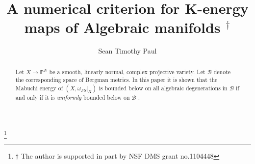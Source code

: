\documentclass[12pt]{amsart}
\numberwithin{equation}{section}
\numberwithin{remark}{section}
\numberwithin{theorem}{section}
\numberwithin{proposition}{section}
\numberwithin{definition}{section}
\numberwithin{lemma}{section}
\numberwithin{claim}{section}
\numberwithin{corollary}{section}
\numberwithin{conjecture}{section}
\begin{document}

\title[numerical criterion ]{A numerical criterion for K-energy maps of Algebraic manifolds $^\dagger$ }
\author{Sean Timothy Paul}   
\thanks{$\dagger$ The author is supported in part by NSF DMS grant no.1104448}
\address{l'Institut Henri Poincar\'e, 11 Rue Pierre et Marie Curie, 75005 Paris, France}
\address{and the Mathematics Dept. Univ. of Wisconsin, Madison}
 
 \vspace{-5mm}
\begin{abstract} {Let $X{\ensuremath{\longrightarrow}}{\ensuremath{\mathbb{P}^{N}}}$ be a smooth, linearly normal, complex projective variety.  Let $\mathcal{B}$ denote the corresponding space of Bergman metrics. In this paper it is shown that the Mabuchi energy of $(X,{{\ensuremath{\omega}}_{FS}}|_X)$ is bounded below on all algebraic degenerations in $\mathcal{B}$ if and only if it is \emph{uniformly} bounded below on $\mathcal{B}$ .}
   \end{abstract}
\maketitle
\setcounter{tocdepth}{1}
\end{document}
